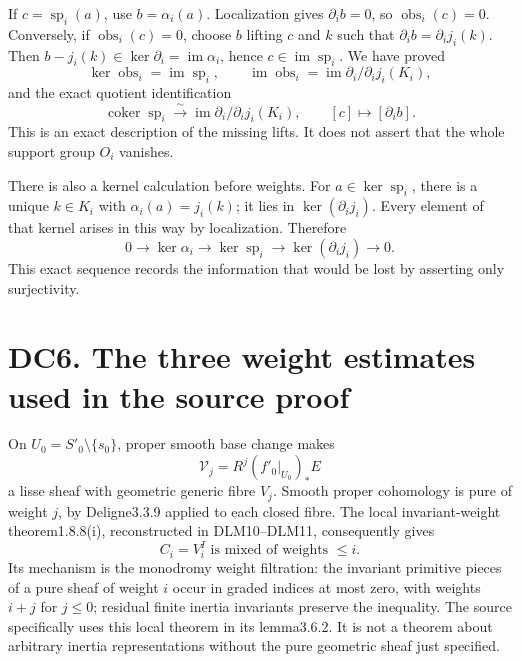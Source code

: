 \documentclass[
]{report}
\begin{document}
If \(c=\operatorname{sp}_i(a)\), use \(b=\alpha_i(a)\). Localization
gives \(\partial_i b=0\), so \(\operatorname{obs}_i(c)=0\). Conversely,
if \(\operatorname{obs}_i(c)=0\), choose \(b\) lifting \(c\) and \(k\)
such that \(\partial_i b=\partial_i j_i(k)\). Then
\(b-j_i(k)\in\ker\partial_i=\operatorname{im}\alpha_i\), hence
\(c\in\operatorname{im}\operatorname{sp}_i\). We have proved \[
\ker\operatorname{obs}_i=\operatorname{im}\operatorname{sp}_i,
\qquad
\operatorname{im}\operatorname{obs}_i
 =\operatorname{im}\partial_i/\partial_i j_i(K_i),
\tag{DC5.3}
\] and the exact quotient identification \[
\operatorname{coker}\operatorname{sp}_i
 \xrightarrow{\sim}
 \operatorname{im}\partial_i/\partial_i j_i(K_i),
\qquad
[c]\longmapsto[\partial_i b].
\tag{DC5.4}
\] This is an exact description of the missing lifts. It does not assert
that the whole support group \(O_i\) vanishes.

There is also a kernel calculation before weights. For
\(a\in\ker\operatorname{sp}_i\), there is a unique \(k\in K_i\) with
\(\alpha_i(a)=j_i(k)\); it lies in \(\ker(\partial_i j_i)\). Every
element of that kernel arises in this way by localization. Therefore \[
0\longrightarrow\ker\alpha_i
 \longrightarrow\ker\operatorname{sp}_i
 \longrightarrow\ker(\partial_i j_i)
 \longrightarrow0.
\tag{DC5.5}
\] This exact sequence records the information that would be lost by
asserting only surjectivity.

\section{DC6. The three weight estimates used in the source
proof}\label{dc6.-the-three-weight-estimates-used-in-the-source-proof}

On \(U_0=S'_0\setminus\{s_0\}\), proper smooth base change makes \[
\mathcal V_j=R^j(f'_0|_{U_0})_*E
\tag{DC6.1}
\] a lisse sheaf with geometric generic fibre \(V_j\). Smooth proper
cohomology is pure of weight \(j\), by Deligne3.3.9 applied to each
closed fibre. The local invariant-weight theorem1.8.8(i), reconstructed
in DLM10--DLM11, consequently gives \[
C_i=V_i^I\text{ is mixed of weights }\le i.
\tag{DC6.2}
\] Its mechanism is the monodromy weight filtration: the invariant
primitive pieces of a pure sheaf of weight \(i\) occur in graded indices
at most zero, with weights \(i+j\) for \(j\le0\); residual finite
inertia invariants preserve the inequality. The source specifically uses
this local theorem in its lemma3.6.2. It is not a theorem about
arbitrary inertia representations without the pure geometric sheaf just
specified.
\end{document}

